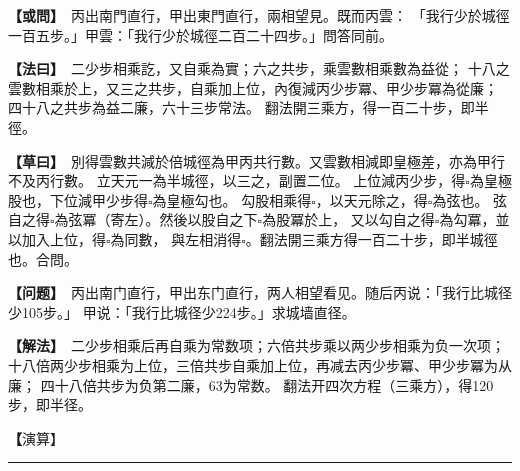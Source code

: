 \documentclass[11pt,a4paper]{article}
\let\origsquare\square
\renewcommand{\square}{\ensuremath{\origsquare}}%
\newcommand{\longline}{\noindent\rule{\textwidth}{0.4pt}}
\newcommand{\clOWEN}[1]{%
  \par\vspace{0.3em}%
  \noindent\textcolor{problemcolor}{\textbf{【或問】}}\,{\tradfont #1}\par\nopagebreak%
}
\newcommand{\mdOWEN}[1]{%
  \par\vspace{0.3em}%
  \noindent\textcolor{problemcolor}{\textbf{【问题】}}\,{\modfont #1}\par\nopagebreak%
}
\newcommand{\clFAYUE}[1]{%
  \par\noindent\textcolor{methodcolor}{\textbf{【法曰】}}\,{\tradfont #1}\par\nopagebreak%
}
\newcommand{\mdFAYUE}[1]{%
  \par\noindent\textcolor{methodcolor}{\textbf{【解法】}}\,{\modfont #1}\par\nopagebreak%
}
\newcommand{\clTSAOYUE}[1]{%
  \par\noindent\textcolor{workcolor}{\textbf{【草曰】}}\,{\tradfont #1}\par%
}
\newcommand{\mdTSAOYUE}[1]{%
  \par\noindent\textcolor{workcolor}{\textbf【演算】}}\,{\modfont #1}\par%
\begin{document}
\begin{paracol}{2}

\begin{leftcolumn}
\clOWEN{%
丙出南門直行，甲出東門直行，兩相望見。既而丙雲：
「我行少於城徑一百五步。」甲雲：「我行少於城徑二百二十四步。」問答同前。}

\clFAYUE{%
二少步相乘訖，又自乘為實；六之共步，乘雲數相乘數為益從；
十八之雲數相乘於上，又三之共步，自乘加上位，內復減丙少步冪、甲少步冪為從廉；
四十八之共步為益二廉，六十三步常法。
翻法開三乘方，得一百二十步，即半徑。}

\clTSAOYUE{%
別得雲數共減於倍城徑為甲丙共行數。又雲數相減即皇極差，亦為甲行不及丙行數。
立天元一為半城徑，以三之，副置二位。
上位減丙少步，得$\square$為皇極股也，下位減甲少步得$\square$為皇極勾也。
勾股相乘得$\square$，以天元除之，得$\square$為弦也。
弦自之得$\square$為弦冪（寄左）。然後以股自之下$\square$為股冪於上，
又以勾自之得$\square$為勾冪，並以加入上位，得$\square$為同數，
與左相消得$\square$。翻法開三乘方得一百二十步，即半城徑也。合問。}
\end{leftcolumn}

\switchcolumn

\begin{rightcolumn}
\mdOWEN{%
丙出南门直行，甲出东门直行，两人相望看见。随后丙说：「我行比城径少105步。」
甲说：「我行比城径少224步。」求城墙直径。}

\mdFAYUE{%
二少步相乘后再自乘为常数项；六倍共步乘以两少步相乘为负一次项；
十八倍两少步相乘为上位，三倍共步自乘加上位，再减去丙少步冪、甲少步冪为从廉；
四十八倍共步为负第二廉，63为常数。
翻法开四次方程（三乘方），得120步，即半径。}

\mdTSAOYUE{%
辨识得：两少步之和从两倍城径中减去为甲丙共行数。两少步相减即皇极差，亦为甲行不及丙行数。
设天元一为半城径，三倍后分置两位。
上位减丙少步，得$\square$为皇极股；下位减甲少步得$\square$为皇极勾。
勾股相乘得$\square$，除以天元得$\square$为弦。
弦自乘得$\square$为弦冪（寄左）。然后股自乘得$\square$为股冪于上位，
勾自乘得$\square$为勾冪，合并加入上位得$\square$为同数，
与左式相消得$\square$。翻法开四次方程（三乘方）得120步，即半城径。符合所问。}
\end{rightcolumn}

\end{paracol}

\vspace{0.3cm}
\begin{center}\longline\end{center}
\end{document}

